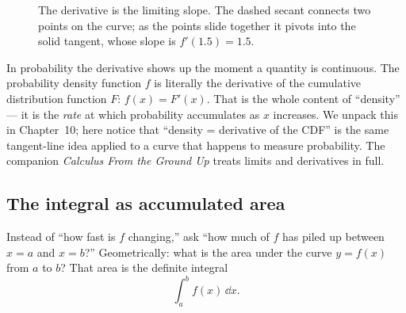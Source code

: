 \begin{figure}[H]
\centering
{}
\caption{The derivative is the limiting slope. The dashed secant connects two points on the curve; as
the points slide together it pivots into the solid tangent, whose slope is $f'(1.5)=1.5$.}
\label{chAcla:fig-tangent}
\end{figure}

\begin{connectionbox}
In probability the derivative shows up the moment a quantity is continuous. The probability density
function $f$ is literally the derivative of the cumulative distribution function $F$: $f(x)=F'(x)$.
That is the whole content of ``density'' --- it is the \emph{rate} at which probability accumulates as
$x$ increases. We unpack this in Chapter~10; here notice that
``density = derivative of the CDF'' is the same tangent-line idea applied to a curve that happens to
measure probability. The companion \emph{Calculus From the Ground Up} treats limits and derivatives in
full.
\end{connectionbox}

\subsection{The integral as accumulated area}
\label{chAcla:integral}

Instead of ``how fast is $f$ changing,'' ask ``how much of $f$ has
piled up between $x=a$ and $x=b$?'' Geometrically: what is the area under the curve $y=f(x)$ from $a$
to $b$? That area is the definite integral
\[
  \int_a^b f(x)\,\dd x.
\]

